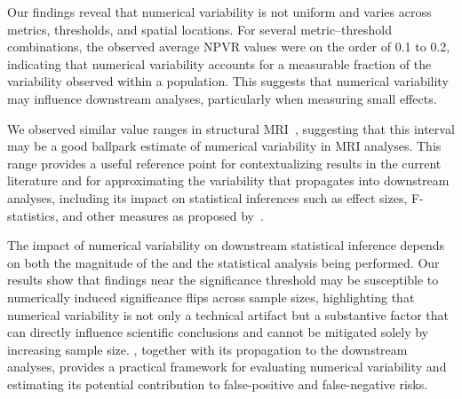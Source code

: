 Our findings reveal that numerical variability is not uniform and varies across metrics, thresholds, and spatial locations.
For several metric--threshold combinations, the observed average NPVR values were on the order of 0.1 to 0.2, indicating that numerical variability accounts for a measurable fraction of the variability observed within a population. This suggests that numerical variability may influence downstream analyses, particularly when measuring small effects.

We observed similar \npvratio{} value ranges in structural MRI~\cite{Yohan2025NPVR}, suggesting that this interval may be a good ballpark estimate of numerical variability in MRI analyses. This range provides a useful reference point for contextualizing results in the current literature and for approximating the variability that propagates into downstream analyses, including its impact on statistical inferences such as effect sizes, F-statistics, and other measures as proposed by~\cite{Yohan2025NPVR}.

The impact of numerical variability on downstream statistical inference depends on both the magnitude of the \npvratio{} and the statistical analysis being performed. Our results show that findings near the significance threshold may be susceptible to numerically induced significance flips across sample sizes, highlighting that numerical variability is not only a technical artifact but a substantive factor that can directly influence scientific conclusions and cannot be mitigated solely by increasing sample size. \npvratio{}, together with its propagation to the downstream analyses, provides a practical framework for evaluating numerical variability and estimating its potential contribution to false-positive and false-negative risks. 

